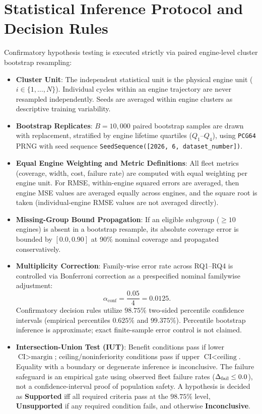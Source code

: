 \section{Statistical Inference Protocol and Decision Rules}
Confirmatory hypothesis testing is executed strictly via paired engine-level cluster bootstrap resampling:
\begin{itemize}
    \item \textbf{Cluster Unit}: The independent statistical unit is the physical engine unit ($i \in \{1, \dots, N\}$). Individual cycles within an engine trajectory are never resampled independently. Seeds are averaged within engine clusters as descriptive training variability.
    \item \textbf{Bootstrap Replicates}: $B = 10{,}000$ paired bootstrap samples are drawn with replacement, stratified by engine lifetime quartiles ($Q_1$--$Q_4$), using \texttt{PCG64} PRNG with seed sequence \texttt{SeedSequence([2026, 6, dataset\_number])}.
    \item \textbf{Equal Engine Weighting and Metric Definitions}: All fleet metrics (coverage, width, cost, failure rate) are computed with equal weighting per engine unit. For RMSE, within-engine squared errors are averaged, then engine MSE values are averaged equally across engines, and the square root is taken (individual-engine RMSE values are not averaged directly).
    \item \textbf{Missing-Group Bound Propagation}: If an eligible subgroup ($\ge 10$ engines) is absent in a bootstrap resample, its absolute coverage error is bounded by $[0.0, 0.90]$ at 90\% nominal coverage and propagated conservatively.
    \item \textbf{Multiplicity Correction}: Family-wise error rate across RQ1--RQ4 is controlled via Bonferroni correction as a prespecified nominal familywise adjustment:
    \begin{equation}
    \alpha_{\text{conf}} = \frac{0.05}{4} = 0.0125.
    \end{equation}
    Confirmatory decision rules utilize $98.75\%$ two-sided percentile confidence intervals (empirical percentiles $0.625\%$ and $99.375\%$). Percentile bootstrap inference is approximate; exact finite-sample error control is not claimed.
    \item \textbf{Intersection-Union Test (IUT)}: Benefit conditions pass if lower $\text{CI} > \text{margin}$; ceiling/noninferiority conditions pass if upper $\text{CI} < \text{ceiling}$. Equality with a boundary or degenerate inference is inconclusive. The failure safeguard is an empirical gate using observed fleet failure rates ($\Delta_{\text{fail}} \le 0.0$), not a confidence-interval proof of population safety. A hypothesis is decided as \textbf{Supported} iff all required criteria pass at the $98.75\%$ level, \textbf{Unsupported} if any required condition fails, and otherwise \textbf{Inconclusive}.
\end{itemize}
